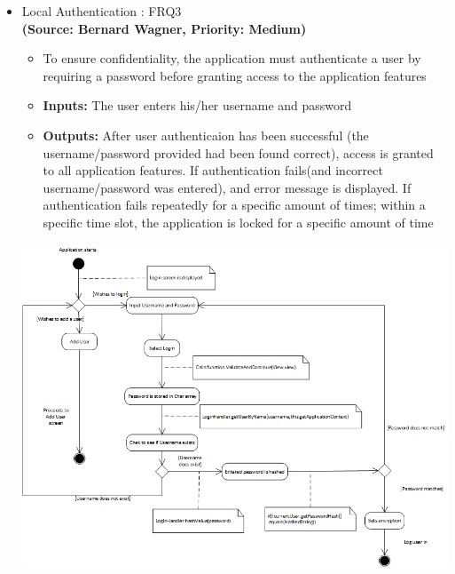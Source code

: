 \begin{itemize}
\item{Local Authentication : FRQ3}\\%
\textbf{(Source: Bernard Wagner, Priority: Medium)}
\begin{itemize}
\item To ensure confidentiality, the application must authenticate a user by requiring a password before granting access to the application features
\item \textbf{Inputs:} The user enters his/her username and password
\item \textbf{Outputs:} After user authenticaion has been successful (the username/password provided had been found correct), access is granted to all application features. If authentication fails(and incorrect username/password was entered), and error message is displayed. If authentication fails repeatedly for a specific amount of times; within a specific time slot, the application is locked for a specific amount of time
\end{itemize}
 \includegraphics[width=13cm]{diagrams/StateDiagrams/LocalAuthenticationStateDiagram.png}
\end{itemize}
